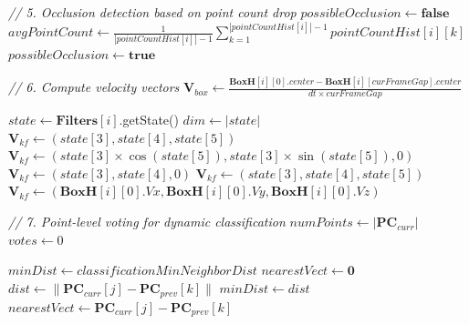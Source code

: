 \documentclass[14pt,a4paper]{article}
\begin{document}
\begin{algorithm}
\begin{algorithmic}[1]
    
    \State \textit{// 5. Occlusion detection based on point count drop}
    \State $possibleOcclusion \gets \textbf{false}$
        \State $avgPointCount \gets \frac{1}{|pointCountHist[i]| - 1} \sum_{k=1}^{|pointCountHist[i]| - 1} pointCountHist[i][k]$
            \State $possibleOcclusion \gets \textbf{true}$
        \EndIf
    \EndIf
    
    \State \textit{// 6. Compute velocity vectors}
    \State $\mathbf{V}_{box} \gets \frac{\mathbf{BoxH}[i][0].center - \mathbf{BoxH}[i][curFrameGap].center}{dt \times curFrameGap}$
    
    \State $state \gets \mathbf{Filters}[i]$.getState()
    \State $dim \gets |state|$
        \State $\mathbf{V}_{kf} \gets (state[3], state[4], state[5])$ 
            \State $\mathbf{V}_{kf} \gets (state[3] \times \cos(state[5]), state[3] \times \sin(state[5]), 0)$ 
        \Else
            \State $\mathbf{V}_{kf} \gets (state[3], state[4], 0)$ 
        \EndIf
        \State $\mathbf{V}_{kf} \gets (state[3], state[4], state[5])$ 
    \Else
        \State $\mathbf{V}_{kf} \gets (\mathbf{BoxH}[i][0].Vx, \mathbf{BoxH}[i][0].Vy, \mathbf{BoxH}[i][0].Vz)$ 
    \EndIf
    
    \State \textit{// 7. Point-level voting for dynamic classification}
    \State $numPoints \gets |\mathbf{PC}_{curr}|$
    \State $votes \gets 0$
    
        \State $minDist \gets classificationMinNeighborDist$
        \State $nearestVect \gets \mathbf{0}$
            \State $dist \gets \|\mathbf{PC}_{curr}[j] - \mathbf{PC}_{prev}[k]\|$
                \State $minDist \gets dist$
                \State $nearestVect \gets \mathbf{PC}_{curr}[j] - \mathbf{PC}_{prev}[k]$
            \EndIf
        \EndFor
        

\end{algorithmic}
\end{algorithm}
\end{document}
